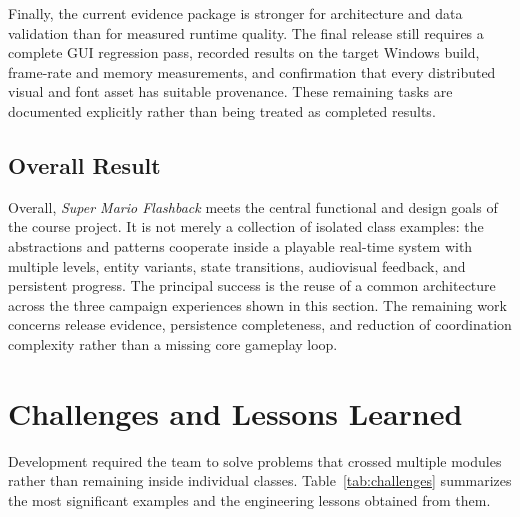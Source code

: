 \documentclass{template}
\begin{document}
Finally, the current evidence package is stronger for architecture and data
validation than for measured runtime quality. The final release still requires
a complete GUI regression pass, recorded results on the target Windows build,
frame-rate and memory measurements, and confirmation that every distributed
visual and font asset has suitable provenance. These remaining tasks are
documented explicitly rather than being treated as completed results.

\subsection{Overall Result}

Overall, \textit{Super Mario Flashback} meets the central functional and design
goals of the course project. It is not merely a collection of isolated class
examples: the abstractions and patterns cooperate inside a playable real-time
system with multiple levels, entity variants, state transitions, audiovisual
feedback, and persistent progress. The principal success is the reuse of a
common architecture across the three campaign experiences shown in this
section. The remaining work concerns release evidence, persistence completeness,
and reduction of coordination complexity rather than a missing core gameplay
loop.

\section{Challenges and Lessons Learned}

Development required the team to solve problems that crossed multiple modules
rather than remaining inside individual classes. Table~\ref{tab:challenges}
summarizes the most significant examples and the engineering lessons obtained
from them.
\end{document}
